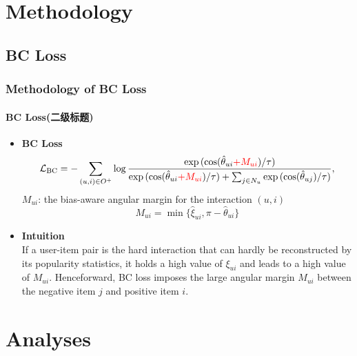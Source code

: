 \documentclass[aspectratio=169]{beamer}%
\begin{document}
{%
\section{Methodology}  
\subsection{BC Loss}
\begin{frame}
    \frametitle{Methodology of BC Loss}
    \framesubtitle{BC Loss(二级标题)}
    \begin{itemize}
        \item
            \textbf{BC Loss}
            \begin{align}\label{equ:bc_loss}
                \mathcal{L}_{\text{BC}} =
                -\sum_{(u,i)\in{O}^{+}}\log\frac{\exp{(\cos(\hat{\theta}_{ui}{\color{red}+M_{ui}})/\tau)}}{\exp{(\cos(\hat{\theta}_{ui}{\color{red}+M_{ui}})/\tau)}+\sum_{j\in{N}_{u}}\exp{(\cos(\hat{\theta}_{uj})/\tau)}},
                \nonumber
            \end{align}
            $M_{ui}$: the bias-aware angular margin for the interaction $(u,i)$ 
            $$M_{ui} = \min \{\hat{\xi}_{ui}, \pi - \hat{\theta}_{ui}\}$$
        \item\textbf{Intuition}\\
                If a user-item pair is the hard interaction that can hardly be reconstructed by its popularity statistics, it holds a
        high value of $\xi_{ui}$ and leads to a high value of $M_{ui}$. Henceforward, BC loss imposes the large angular
        margin $M_{ui}$ between the negative item $j$ and positive item $i$.
    \end{itemize}
\end{frame}

\section{Analyses}  
}
\end{document}
